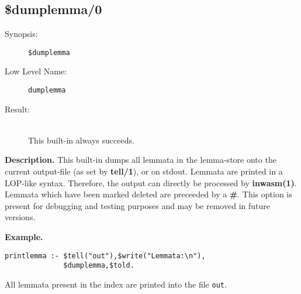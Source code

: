 %
%
%
\subsection{\$dumplemma/0}

\begin{description}
\item[Synopsis:]
	{\tt \$dumplemma}
\item[Low Level Name:]
	{\tt dumplemma}
\item[Result:]\ \\
This built-in always succeeds.
\end{description}

\vspace*{0.5cm}
\noindent
{\bf Description.}
This built-in dumps all lemmata in the lemma-store
onto the current output-file (as set by {\bf tell/1}), or on
stdout.
Lemmata are printed in a LOP-like syntax. Therefore, the output can directly
be processed by {\bf inwasm(1)}.
Lemmata which have been marked deleted are preceeded by a {\bf \#}.
This option is present for debugging and testing purposes and may
be removed in future versions.

\vspace*{0.5cm}
\noindent
{\bf Example.}
\begin{verbatim}
printlemma :- $tell("out"),$write("Lemmata:\n"),
              $dumplemma,$told.

\end{verbatim}
All lemmata present in the index are printed into the file {\tt out}.


